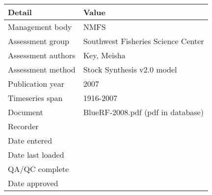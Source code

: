 \begin{table}[htb]
\centering
\begin{tabular}{lp{7cm}}
\toprule
Detail & Value \\
\midrule
Management body    & NMFS                               \\
Assessment group   & Southwest Fisheries Science Center \\
Assessment authors & Key, Meisha                        \\
Assessment method  & Stock Synthesis v2.0 model         \\
Publication year   & 2007                               \\
Timeseries span    & 1916-2007                          \\
Document           & BlueRF-2008.pdf (pdf in database)  \\
Recorder           &                                    \\
Date entered       &                                    \\
Date last loaded   &                                    \\
QA/QC complete     &                                    \\
Date approved      &                                    \\
\bottomrule
\end{tabular}
\label{tab:assessdet}
\end{table}
